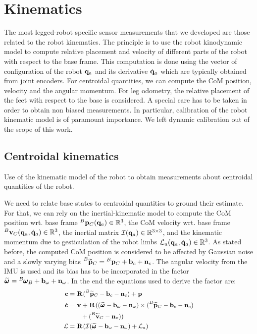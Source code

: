 \chapter{Kinematics}
\minitoc

The most legged-robot specific sensor measurements that we developed are those related to the robot kinematics. 
The principle is to use the robot kinodynamic model to compute relative placement and velocity of different parts of the robot 
with respect to the base frame. This computation is done using the vector of configuration of the robot ${\bf q}_a$ and its derivative $\dot{{\bf q}}_a$ which
are typically obtained from joint encoders.
For centroidal quantities, we can compute the CoM position, velocity and the angular momentum.
For leg odometry, the relative placement of the feet with respect to the base is considered. A special care has to be taken in order to
obtain non biased measurements. In particular, calibration of the robot kinematic model is of paramount importance. We left dynamic calibration 
out of the scope of this work.


\section{Centroidal kinematics}
Use of the kinematic model of the robot to obtain measurements about centroidal quantities of the robot.

We need to relate base states to centroidal quantities to ground their estimate. 
For that, we can rely on the inertial-kinematic model to compute the CoM position wrt. base frame $\prescript{B}{}{{\bf p}}_{C}({\bf q}_a) \in \mathbb{R}^3$, the CoM velocity wrt. 
base frame $\prescript{B}{}{{\bf v}}_{C}({\bf q}_a, \dot{{\bf q}}_a) \in \mathbb{R}^3$, the inertial matrix $\mathcal{I}({\bf q}_a) \in \mathbb{R}^{3\times 3}$, and  the kinematic momentum due to gesticulation 
of the robot limbs $\mathcal{L}_a({\bf q}_a, \dot{{\bf q}}_a) \in \mathbb{R}^{3}$. 
As stated before, the computed CoM position is considered to be affected by Gaussian noise and a slowly varying bias $\prescript{B}{}{\widetilde{{\bf p}}}_{C} = \prescript{B}{}{{\bf p}}_{C} + {\bf b}_{c} + {\bf n}_c$. 
The angular velocity from the IMU is used and its bias has to be incorporated in the factor $\prescript{}{}{\widetilde{\pmb{\omega}}}_{} = \prescript{B}{}{\pmb{\omega}}_{B} + {\bf b}_{\omega} + {\bf n}_{\omega}$.  
In the end the equations used to derive the factor are:
%
\begin{equation}
\small
\begin{split}
{\bf c} &= \prescript{}{}{{\bf R}}_{} (\prescript{B}{}{\widetilde{{\bf p}}}_{C} -  {\bf b}_{c} - {\bf n}_{c}) + \prescript{}{}{{\bf p}}_{}
\\
\dot{{\bf c}} &= 
\prescript{}{}{{\bf v}}_{} + \prescript{}{}{{\bf R}}_{}((\prescript{}{}{\widetilde{\pmb{\omega}}}_{} - {\bf b}_{\omega} - {\bf n}_{\omega}) \times (\prescript{B}{}{\widetilde{{\bf p}}}_{C} -  {\bf b}_c - {\bf n}_c) 
\\&~~~~~~+ (\prescript{B}{}{\widetilde{{\bf v}}}_{C} - {\bf n}_{v}))
\\
\mathcal{L} &= \prescript{}{}{{\bf R}}_{}(\mathcal{I} (\prescript{}{}{\widetilde{\pmb{\omega}}}_{} - {\bf b}_{\omega} - {\bf n}_{\omega}) + \mathcal{L}_a)
\end{split}
\end{equation}

